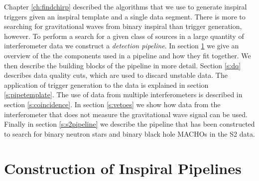 
Chapter \ref{ch:findchirp} described the algorithms that we use to generate
inspiral triggers given an inspiral template and a single data segment.  There
is more to searching for gravitational waves from binary inspiral than trigger
generation, however. To perform a search for a given class of sources in a
large quantity of interferometer data we construct a \emph{detection
pipeline}.  In section \ref{s:construction} we give an overview of the
the components used in a pipeline and how they fit together.
We then describe the building blocks of the pipeline in more detail. Section
\ref{s:dq} describes data quality cuts, which are used to discard unstable
data. The application of trigger generation to the data is explained in
section \ref{s:pipetemplate}. The use of data from multiple interferometers is
described in section \ref{s:coincidence}. In section \ref{s:vetoes} we
show how data from the interferometer that does not measure the gravitational
wave signal can be used.  Finally in section \ref{s:s2pipeline} we describe
the pipeline that has been constructed to search for binary neutron stars and
binary black hole MACHOs in the S2 data.

\section{Construction of Inspiral Pipelines}
\label{s:construction}

